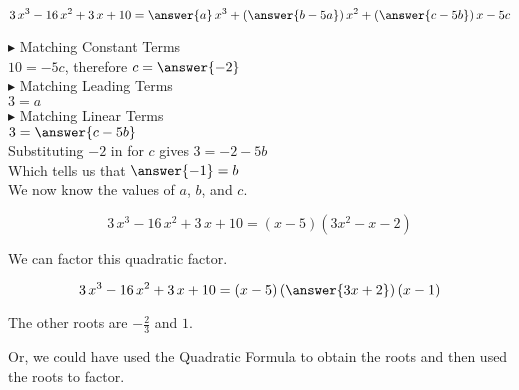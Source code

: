 \documentclass{ximera}
\begin{document}
\begin{example}
\[
3\, x^3 - 16 \, x^2 + 3 \, x + 10 = \answer{a} \, x^3 + \left( \answer{b-5a} \right) x^2 + \left( \answer{c-5b} \right) x - 5c
\]



$\blacktriangleright$ Matching Constant Terms \\


$10 = -5c$, therefore $c = \answer{-2}$ \\



$\blacktriangleright$ Matching Leading Terms \\


$3 = a$ \\



$\blacktriangleright$ Matching Linear Terms \\

$3 = \answer{c-5b}$ \\

Substituting $-2$ in for $c$ gives $3 = -2 - 5b$ \\

Which tells us that $\answer{-1} = b$ \\



We now know the values of $a$, $b$, and $c$.


\[
3\, x^3 - 16 \, x^2 + 3 \, x + 10  = (x - 5) (3 x^2 -  x - 2) 
\]


We can factor this quadratic factor.

\[
3\, x^3 - 16 \, x^2 + 3 \, x + 10  = (x - 5) \left(\answer{3x + 2} \right) (x - 1) 
\]


The other roots are $-\frac{2}{3}$ and $1$. 


Or, we could have used the Quadratic Formula to obtain the roots and then used the roots to factor.








\end{example}
\end{document}
